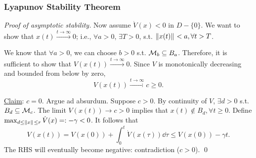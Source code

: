 \begin{frame}
    \frametitle{Lyapunov Stability Theorem}

    \begin{proof}[Proof of asymptotic stability]
        Now assume $\dot{V}(x) < 0$ in $D - \{0\}$. We want to show that $x(t)
        \xrightarrow{t \to \infty} 0$; i.e., $\forall a > 0$, $\exists T > 0$, 
        s.t. $\|{x(t)}\|_{{}_{}} < a, \forall t > T$.

        We know that $\forall a > 0$, we can choose $b > 0$ s.t. $\mathcal{M}_b
        \subseteq B_a$. Therefore, it is sufficient to show that $V(x(t))
        \xrightarrow{t \to \infty} 0$. Since $V$ is monotonically decreasing and
        bounded from below by zero, \[ V(x(t)) \xrightarrow{t \to \infty} c \geq
        0. \]

        \underline{Claim}: $c = 0$. Argue ad absurdum. Suppose $c > 0$. By
        continuity of $V$, $\exists d > 0$ s.t. $B_d \subseteq \mathcal{M}_c$. The
        limit $V(x(t)) \rightarrow c > 0$ implies that $x(t) \notin B_d, \forall
        t \geq 0$. Define $\max_{d \leq \|{x}\|_{{}_{}} \leq r} \dot{V}(x) =: -\gamma
        < 0$. It follows that 
        \[
        V(x(t)) = V(x(0)) + \int_0^t \dot{V}(x(\tau)) \dd \tau \leq V(x(0)) - \gamma t.
        \]
        The RHS will eventually become negative: contradiction ($c > 0$). \hfill 
        \qed
    \end{proof}
\end{frame}


